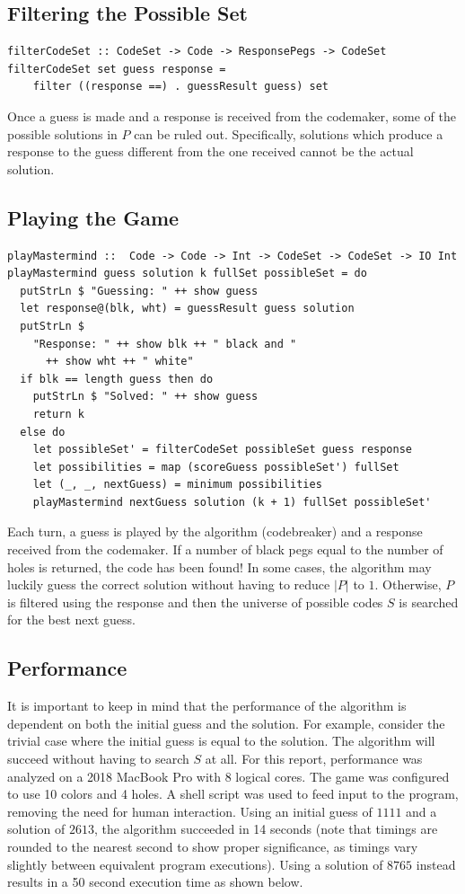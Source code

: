 \documentclass{article}
\begin{document}
\subsection{Filtering the Possible Set}
\begin{verbatim}
filterCodeSet :: CodeSet -> Code -> ResponsePegs -> CodeSet
filterCodeSet set guess response =
    filter ((response ==) . guessResult guess) set
\end{verbatim}
Once a guess is made and a response is received from the codemaker, some of the possible solutions in $P$ can be ruled out. Specifically, solutions which produce a response to the guess different from the one received cannot be the actual solution.

\subsection{Playing the Game}
\begin{verbatim}
playMastermind ::  Code -> Code -> Int -> CodeSet -> CodeSet -> IO Int
playMastermind guess solution k fullSet possibleSet = do
  putStrLn $ "Guessing: " ++ show guess
  let response@(blk, wht) = guessResult guess solution
  putStrLn $
    "Response: " ++ show blk ++ " black and "
      ++ show wht ++ " white"
  if blk == length guess then do
    putStrLn $ "Solved: " ++ show guess
    return k
  else do
    let possibleSet' = filterCodeSet possibleSet guess response
    let possibilities = map (scoreGuess possibleSet') fullSet
    let (_, _, nextGuess) = minimum possibilities
    playMastermind nextGuess solution (k + 1) fullSet possibleSet'
\end{verbatim}
Each turn, a guess is played by the algorithm (codebreaker) and a response received from the codemaker. If a number of black pegs equal to the number of holes is returned, the code has been found! In some cases, the algorithm may luckily guess the correct solution without having to reduce $|P|$ to $1$. Otherwise, $P$ is filtered using the response and then the universe of possible codes $S$ is searched for the best next guess.

\subsection{Performance}
It is important to keep in mind that the performance of the algorithm is dependent on both the initial guess and the solution. For example, consider the trivial case where the initial guess is equal to the solution. The algorithm will succeed without having to search $S$ at all. For this report, performance was analyzed on a 2018 MacBook Pro with 8 logical cores. The game was configured to use 10 colors and 4 holes. A shell script was used to feed input to the program, removing the need for human interaction. Using an initial guess of $1111$ and a solution of $2613$, the algorithm succeeded in 14 seconds (note that timings are rounded to the nearest second to show proper significance, as timings vary slightly between equivalent program executions). Using a solution of $8765$ instead results in a 50 second execution time as shown below.
\end{document}
